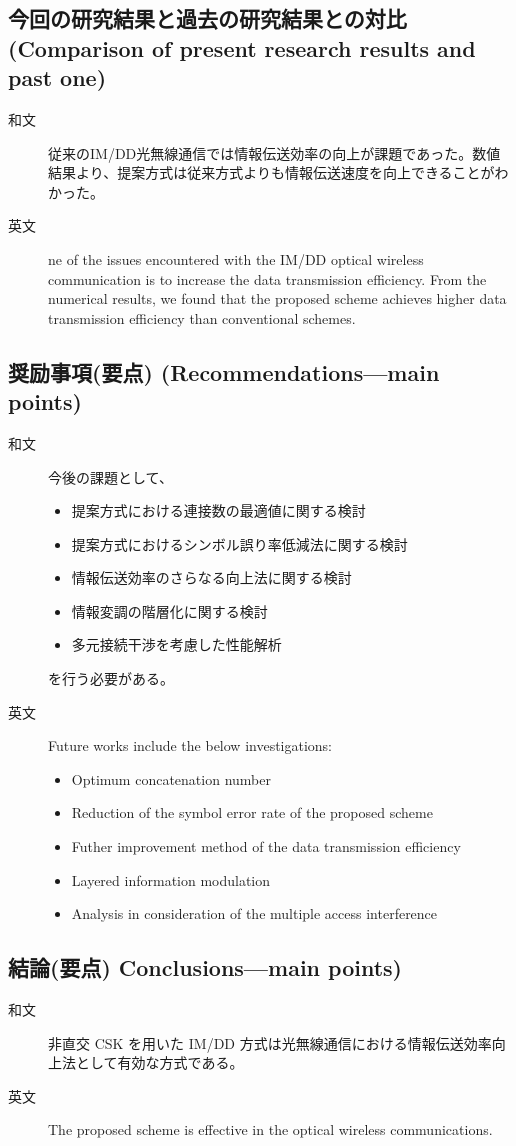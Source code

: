 ﻿\documentclass[a4j,10pt]{jarticle}
\begin{document}
\subsection{今回の研究結果と過去の研究結果との対比 (Comparison of 
present research results and past one)}
\begin{description}
 \item[和文] 従来のIM/DD光無線通信では情報伝送効率の向上が課題であった。数値結果より、提案方式は従来方式よりも情報伝送速度を向上できることがわかった。
 \item[英文] ne of the issues encountered with the IM/DD optical wireless communication is to increase the data transmission efficiency. From the numerical results, we found that the proposed scheme achieves higher data transmission efficiency than conventional schemes.
\end{description}
%
\subsection{奨励事項(要点) (Recommendations---main points)}
\begin{description}
 \item[和文] 今後の課題として、
\begin{itemize}
 \item 提案方式における連接数の最適値に関する検討
 \item 提案方式におけるシンボル誤り率低減法に関する検討
 \item 情報伝送効率のさらなる向上法に関する検討
 \item 情報変調の階層化に関する検討
 \item 多元接続干渉を考慮した性能解析
\end{itemize}
を行う必要がある。
%
 \item[英文] Future works include the below investigations:
 \begin{itemize}
  \item Optimum concatenation number 
  \item Reduction of the symbol error rate of the proposed scheme 
  \item Futher improvement method of the data transmission efficiency 
  \item Layered information modulation 
  \item Analysis in consideration of the multiple access interference
 \end{itemize}
\end{description}
%
\subsection{結論(要点) Conclusions---main points)}
\begin{description}
 \item[和文] 非直交 CSK を用いた IM/DD 方式は光無線通信における情報伝送効率向上法として有効な方式である。
%
 \item[英文] The proposed scheme is effective in the optical wireless communications. 
\end{description}
%
\end{document}
